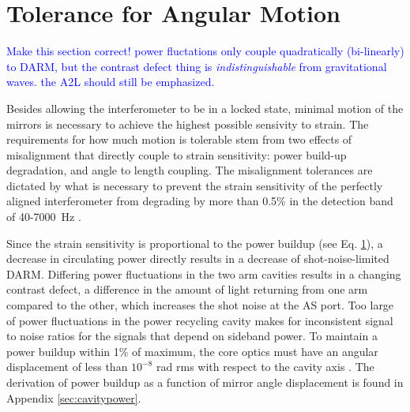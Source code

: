 









\section{Tolerance for Angular Motion}
\textcolor{blue}{Make this section correct! power fluctations only couple quadratically (bi-linearly) to DARM, but the contrast defect thing is \emph{indistinguishable} from gravitational waves. the A2L should still be emphasized.}

Besides allowing the interferometer to be in a locked state, minimal motion of the mirrors is necessary to achieve the highest possible sensivity to strain. The requirements for how much motion is tolerable stem from two effects of misalignment that directly couple to strain sensitivity: power build-up degradation, and angle to length coupling. The misalignment tolerances are dictated by what is necessary to prevent the strain sensitivity of the perfectly aligned interferometer from degrading by more than 0.5\% in the detection band of 40-7000~Hz \cite{Fritschel1997Alignment}.

Since the strain sensitivity is proportional to the power buildup (see Eq. \ref{}), a decrease in circulating power directly results in a decrease of shot-noise-limited DARM. Differing power fluctuations in the two arm cavities results in a changing contrast defect, a difference in the amount of light returning from one arm compared to the other, which increases the shot noise at the AS port. Too large of power fluctuations in the power recycling cavity makes for inconsistent signal to noise ratios for the signals that depend on sideband power. To maintain a power buildup within 1\% of maximum, the core optics must have an angular displacement of less than $10^{-8}$ rad rms with respect to the cavity axis \cite{ISCGroup1998ASC}. The derivation of power buildup as a function of mirror angle displacement is found in Appendix \ref{sec:cavitypower}.


